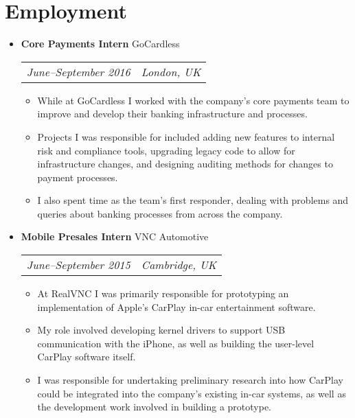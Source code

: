 \documentclass[letterpaper]{article}
\begin{document}
\section*{Employment}

\begin{itemize}

    \item \textbf{Core Payments Intern} GoCardless \\
        \begin{tabular}{c|c}
            \emph{June--September 2016} & \emph{London, UK}
        \end{tabular}
        \begin{itemize}
          \item While at GoCardless I worked with the company's core payments
            team to improve and develop their banking infrastructure and
            processes.
          \item Projects I was responsible for included adding new features to
            internal risk and compliance tools, upgrading legacy code to allow
            for infrastructure changes, and designing auditing methods for
            changes to payment processes.
          \item I also spent time as the team's first responder, dealing with
            problems and queries about banking processes from across the
            company.
        \end{itemize}

    \item \textbf{Mobile Presales Intern} VNC Automotive \\
        \begin{tabular}{c|c}
            \emph{June--September 2015} & \emph{Cambridge, UK}
        \end{tabular}
        \begin{itemize}
            \item At RealVNC I was primarily responsible for prototyping an
              implementation of Apple's CarPlay in-car entertainment software.

            \item My role involved developing kernel drivers to support USB
              communication with the iPhone, as well as building the user-level
              CarPlay software itself.

            \item I was responsible for undertaking preliminary research into
              how CarPlay could be integrated into the company's existing in-car
              systems, as well as the development work involved in building a
              prototype.
        \end{itemize}


\end{itemize}
\end{document}
